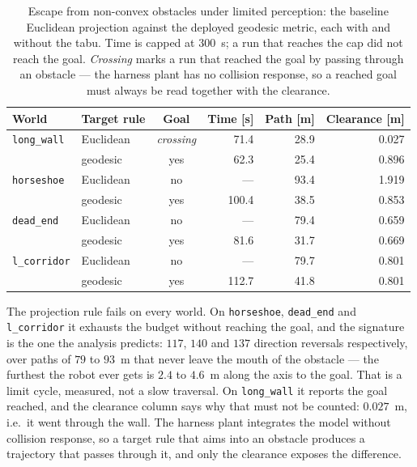 \documentclass[11pt,a4paper]{article}
\begin{document}
\begin{table}[htbp]
  \centering
  \small
  \caption{Escape from non-convex obstacles under limited perception: the baseline Euclidean projection
  against the deployed geodesic metric, each with and without the tabu. Time is capped at $300$~s; a run that reaches
  the cap did not reach the goal. \emph{Crossing} marks a run that reached the goal by passing through an
  obstacle --- the harness plant has no collision response, so a reached goal must always be read together
  with the clearance.}
  \label{tab:escape}
  \begin{tabular}{llcrrr}
    \toprule
    World & Target rule & Goal & Time [s] & Path [m] & Clearance [m] \\
    \midrule
    \texttt{long\_wall}  & Euclidean          & \emph{crossing} & 71.4 & 28.9 & 0.027 \\
                         & geodesic           & yes & 62.3 & 25.4 & 0.896 \\
    \midrule
    \texttt{horseshoe}   & Euclidean          & no  & --- & 93.4 & 1.919 \\
                         & geodesic           & yes & 100.4 & 38.5 & 0.853 \\
    \midrule
    \texttt{dead\_end}   & Euclidean          & no  & --- & 79.4 & 0.659 \\
                         & geodesic           & yes & 81.6 & 31.7 & 0.669 \\
    \midrule
    \texttt{l\_corridor} & Euclidean          & no  & --- & 79.7 & 0.801 \\
                         & geodesic           & yes & 112.7 & 41.8 & 0.801 \\
    \bottomrule
  \end{tabular}
\end{table}

The projection rule fails on every world. On \texttt{horseshoe}, \texttt{dead\_end} and \texttt{l\_corridor} it
exhausts the budget without reaching the goal, and the signature is the one the analysis predicts: $117$,
$140$ and $137$ direction reversals respectively, over paths of $79$ to $93$~m that never leave the mouth of
the obstacle --- the furthest the robot ever gets is $2.4$ to $4.6$~m along the axis to the goal. That is a
limit cycle, measured, not a slow traversal. On \texttt{long\_wall} it reports the goal reached, and the
clearance column says why that must not be counted: $0.027$~m, i.e.\ it went through the wall. The harness
plant integrates the model without collision response, so a target rule that aims into an obstacle produces a
trajectory that passes through it, and only the clearance exposes the difference.
\end{document}
